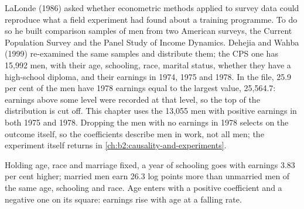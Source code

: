 \begin{measure}[The comparison sample]
LaLonde (1986) asked whether econometric methods applied to survey data could reproduce what a field experiment had found
about a training programme. To do so he built comparison samples of men from two American surveys, the Current Population
Survey and the Panel Study of Income Dynamics. Dehejia and Wahba (1999) re-examined the same samples and distribute them;
the CPS one has 15,992 men, with their age, schooling, race, marital status, whether they have a high-school diploma, and
their earnings in 1974, 1975 and 1978. In the file, 25.9 per cent of the men have 1978 earnings equal to the largest value,
25,564.7: earnings above some level were recorded at that level, so the top of the distribution is cut off. This chapter
uses the 13,055 men with positive earnings in both 1975 and 1978. Dropping the men with no earnings in 1978 selects on the
outcome itself, so the coefficients describe men in work, not all men; the experiment itself returns in \cref{ch:b2:causality-and-experiments}.
\end{measure}

\label{lst:b2:multiple-regression:load}

\label{out:b2:multiple-regression:load}

\label{lst:b2:multiple-regression:ols}

\label{out:b2:multiple-regression:ols}

Holding age, race and marriage fixed, a year of schooling goes with earnings 3.83 per cent higher; married men earn 26.3
log points more than unmarried men of the same age, schooling and race. Age enters with a positive coefficient and a
negative one on its square: earnings rise with age at a falling rate.

